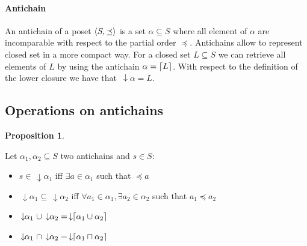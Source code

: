 \documentclass[letterpaper]{article}
\DeclarePairedDelimiter{\ceil}{\lceil}{\rceil}
\DeclarePairedDelimiter{\tuple}{\langle}{\rangle}
\newcommand{\darrow}{\, \downarrow \!\!}
\theoremstyle{definition}
\newtheorem{proposition}{Proposition}[subsection]
\begin{document}
\paragraph{Antichain}

An antichain of a poset $\tuple{S, \preceq}$
is a set $\alpha \subseteq S$ where all element of $\alpha$
are incomparable with respect to the partial order $\preceq$.
Antichains allow to represent closed set in a more compact way.
For a closed set $L \subseteq S$ we can retrieve all elements of $L$ by using
the antichain $\alpha = \ceil{L}$. With respect
to the definition of the lower closure we have that $\darrow \alpha = L$.

\subsection{Operations on antichains}




\begin{proposition}

\label{antichains_ops}

Let $\alpha_1, \alpha_2 \subseteq S$ two antichains and $s \in S$:

\begin{itemize}
    \item $s \in \darrow \alpha_1$
    iff $\exists a \in \alpha_1$ such that $\preceq a$
    \item $\darrow \alpha_1 \subseteq \darrow \alpha_2$
    iff $\forall a_1 \in \alpha_1,
    \exists a_2 \in \alpha_2$ such that $a_1 \preceq a_2$
    \item $ \darrow \alpha_1 \ \cup \darrow \alpha_2 =
    \darrow \ceil{\alpha_1 \cup \alpha_2}$
    \item $\darrow \alpha_1 \ \cap \darrow \alpha_2 =
    \darrow \ceil{\alpha_1 \sqcap \alpha_2}$


\end{itemize}

\end{proposition}



%
%
\end{document}
